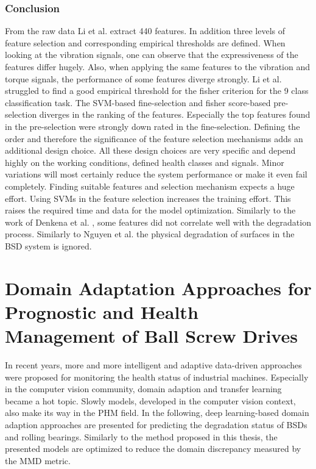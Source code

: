 \subsubsection{Conclusion}
From the raw data Li et al. extract 440 features. In addition three levels of feature selection and corresponding empirical thresholds are defined. When looking at the vibration signals, one can observe that the expressiveness of the features differ hugely. Also, when applying the same features to the vibration and torque signals, the performance of some features diverge strongly. Li et al. struggled to find a good empirical threshold for the fisher criterion for the 9 class classification task. The SVM-based fine-selection and fisher score-based pre-selection diverges in the ranking of the features. Especially the top features found in the pre-selection were strongly down rated in the fine-selection. Defining the order and therefore the significance of the feature selection mechanisms adds an additional design choice. All these design choices are very specific and depend highly on the working conditions, defined health classes and signals. Minor variations will most certainly reduce the system performance or make it even fail completely. Finding suitable features and selection mechanism expects a huge effort. Using SVMs in the feature selection increases the training effort. This raises the required time and data for the model optimization. Similarly to the work of Denkena et al. \cite{Denkena2021}, some features did not correlate well with the degradation process. Similarly to Nguyen et al. \cite{NGUYEN2019} the physical degradation of surfaces in the BSD system is ignored. 

\section{Domain Adaptation Approaches for Prognostic and Health Management of Ball Screw Drives}
In recent years, more and more intelligent and adaptive data-driven approaches were proposed for monitoring the health status of industrial machines. Especially in the computer vision community, domain adaption and transfer learning became a hot topic. Slowly models, developed in the computer vision context, also make its way in the PHM field. In the following, deep learning-based domain adaption approaches are presented for predicting the degradation status of BSDs and rolling bearings. Similarly to the method proposed in this thesis, the presented models are optimized to reduce the domain discrepancy measured by the MMD metric.


